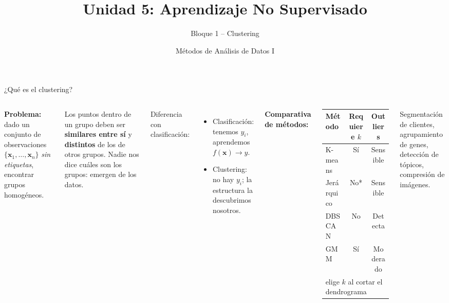 \documentclass[aspectratio=169]{beamer}
\title[Unidad 5 -- Clustering]{Unidad 5: Aprendizaje No Supervisado}
\subtitle{Bloque 1 -- Clustering}
\author[MAD1 -- UNS]{Métodos de Análisis de Datos I}
\institute{Departamento de Matemática -- Universidad Nacional del Sur}
\date{}
\begin{document}

\begin{frame}
\titlepage
\end{frame}

\begin{frame}{¿Qué es el clustering?}
\begin{columns}[T]
\textbf{Problema:} dado un conjunto de observaciones $\{\mathbf{x}_1,\ldots,\mathbf{x}_n\}$ \emph{sin etiquetas}, encontrar grupos homogéneos.

\medskip
\begin{concepto}
Los puntos dentro de un grupo deben ser \textbf{similares entre sí} y \textbf{distintos} de los de otros grupos. Nadie nos dice cuáles son los grupos: emergen de los datos.
\end{concepto}

\medskip
Diferencia con clasificación:
\begin{itemize}
  \item Clasificación: tenemos $y_i$, aprendemos $f(\mathbf{x}) \to y$.
  \item Clustering: no hay $y_i$; la estructura la descubrimos nosotros.
\end{itemize}

\textbf{Comparativa de métodos:}
\medskip

{\small
\begin{tabular}{lcc}
\toprule
\textbf{Método} & \textbf{Requiere $k$} & \textbf{Outliers} \\
\midrule
K-means    & Sí  & Sensible \\
Jerárquico & No* & Sensible \\
DBSCAN     & No  & Detecta \\
GMM        & Sí  & Moderado \\
\bottomrule
\multicolumn{3}{l}{\tiny *elige $k$ al cortar el dendrograma}
\end{tabular}
}

\medskip
\begin{aplicacion}
Segmentación de clientes, agrupamiento de genes, detección de tópicos, compresión de imágenes.
\end{aplicacion}
\end{columns}
\end{frame}
\end{document}
